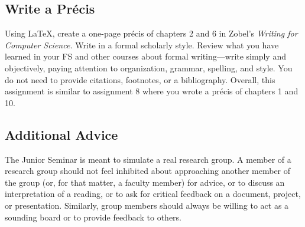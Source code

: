 
\usepackage[compact]{titlesec}





\subsection*{Write a Pr\'{e}cis} 

Using \LaTeX, create a one-page pr\'{e}cis of chapters 2 and 6 in Zobel's {\em Writing for Computer Science.} Write in a
formal scholarly style. Review what you have learned in your FS and other courses about formal writing---write simply
and objectively, paying attention to organization, grammar, spelling, and style. You do not need to provide citations,
footnotes, or a bibliography. Overall, this assignment is similar to assignment 8 where you wrote a pr\'{e}cis of
chapters 1 and 10. 


\subsection*{Additional Advice}

The Junior Seminar is meant to simulate a real research group.  A member of a research group should not feel inhibited
about approaching another member of the group (or, for that matter, a faculty member) for advice, or to discuss an
interpretation of a reading, or to ask for critical feedback on a document, project, or presentation.  Similarly, group
members should always be willing to act as a sounding board or to provide feedback to others.  


